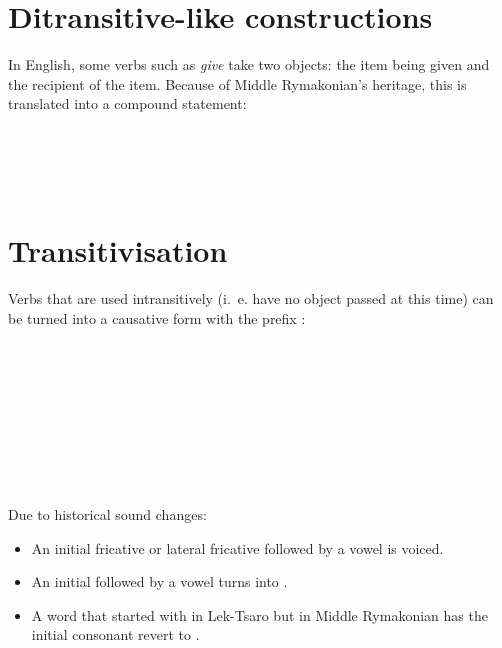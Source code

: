 \documentclass{book}
\newcommand{\lname}{Middle Rymakonian}
\begin{document}
\section{Ditransitive-like constructions}

In English, some verbs such as \emph{give} take two objects: the item being given and the recipient of the item. Because of \lname{}'s heritage, this is translated into a compound statement: \\
~\\
 \\
 \\
     \\
   

\section{Transitivisation}

Verbs that are used intransitively (i.~e. have no object passed at this time) can be turned into a causative form with the prefix : \\
~\\
 \\
  \\
  \\
~\\
 \\
 \\
   \\
   \\

Due to historical sound changes:

\begin{itemize}
  \item An initial fricative or lateral fricative followed by a vowel is voiced.
  \item An initial  followed by a vowel turns into .
  \item A word that started with  in Lek-Tsaro but  in \lname{} has the initial consonant revert to .
\end{itemize}
\end{document}
